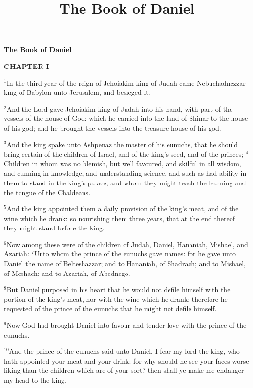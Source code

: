 \documentclass[12pt]{article}
\title{The Book of Daniel}
\begin{document}
\thispagestyle{empty}
\begin{center}
\textbf{\Large The Book of Daniel}\\

\end{center}


\begin{center}
\textbf{\small CHAPTER I}
\end{center}


$^{1}$In the third year of the reign of Jehoiakim king of Judah came
Nebuchadnezzar king of Babylon unto Jerusalem, and besieged it.


$^{2}$And the Lord gave Jehoiakim king of Judah into his hand, with part
of the vessels of the house of God: which he carried into the land of
Shinar to the house of his god; and he brought the vessels into the
treasure house of his god.


$^{3}$And the king spake unto Ashpenaz the master of his eunuchs, that
he should bring certain of the children of Israel, and of the king's
seed, and of the princes; $^{4}$Children in whom was no blemish, but
well favoured, and skilful in all wisdom, and cunning in knowledge,
and understanding science, and such as had ability in them to stand in
the king's palace, and whom they might teach the learning and the
tongue of the Chaldeans.


$^{5}$And the king appointed them a daily provision of the king's meat,
and of the wine which he drank: so nourishing them three years, that
at the end thereof they might stand before the king.


$^{6}$Now among these were of the children of Judah, Daniel, Hananiah,
Mishael, and Azariah: $^{7}$Unto whom the prince of the eunuchs gave
names: for he gave unto Daniel the name of Belteshazzar; and to
Hananiah, of Shadrach; and to Mishael, of Meshach; and to Azariah, of
Abednego.


$^{8}$But Daniel purposed in his heart that he would not defile himself
with the portion of the king's meat, nor with the wine which he drank:
therefore he requested of the prince of the eunuchs that he might not
defile himself.


$^{9}$Now God had brought Daniel into favour and tender love with the
prince of the eunuchs.


$^{10}$And the prince of the eunuchs said unto Daniel, I fear my lord
the king, who hath appointed your meat and your drink: for why should
he see your faces worse liking than the children which are of your
sort? then shall ye make me endanger my head to the king.
\end{document}
